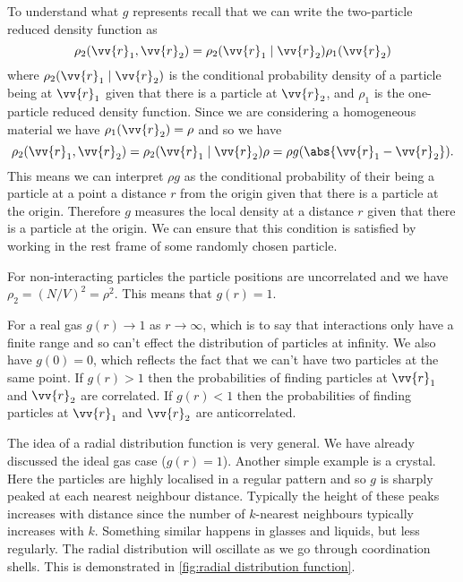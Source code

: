 \documentclass[fleqn]{NotesClass}
\begin{document}
    To understand what \(g\) represents recall that we can write the two-particle reduced density function as
    \begin{equation}
        \rho_2(\vv{r}_1, \vv{r}_2) = \rho_2(\vv{r}_1 \mid \vv{r}_2) \rho_1(\vv{r}_2)
    \end{equation}
    where \(\rho_2(\vv{r}_1 \mid \vv{r}_2)\) is the conditional probability density of a particle being at \(\vv{r}_1\) given that there is a particle at \(\vv{r}_2\), and \(\rho_1\) is the one-particle reduced density function.
    Since we are considering a homogeneous material we have \(\rho_1(\vv{r}_2) = \rho\) and so we have
    \begin{equation}
        \rho_2(\vv{r}_1, \vv{r}_2) = \rho_2(\vv{r}_1 \mid \vv{r}_2) \rho = \rho g(\abs{\vv{r}_1 - \vv{r}_2}).
    \end{equation}
    This means we can interpret \(\rho g\) as the conditional probability of their being a particle at a point a distance \(r\) from the origin given that there is a particle at the origin.
    Therefore \(g\) measures the local density at a distance \(r\) given that there is a particle at the origin.
    We can ensure that this condition is satisfied by working in the rest frame of some randomly chosen particle.
    
    For non-interacting particles the particle positions are uncorrelated and we have \(\rho_2 = (N/V)^2 = \rho^2\).
    This means that \(g(r) = 1\).
    
    For a real gas \(g(r) \to 1\) as \(r \to \infty\), which is to say that interactions only have a finite range and so can't effect the distribution of particles at infinity.
    We also have \(g(0) = 0\), which reflects the fact that we can't have two particles at the same point.
    If \(g(r) > 1\) then the probabilities of finding particles at \(\vv{r}_1\) and \(\vv{r}_2\) are correlated.
    If \(g(r) < 1\) then the probabilities of finding particles at \(\vv{r}_1\) and \(\vv{r}_2\) are anticorrelated.
    
    The idea of a radial distribution function is very general.
    We have already discussed the ideal gas case (\(g(r) = 1\)).
    Another simple example is a crystal.
    Here the particles are highly localised in a regular pattern and so \(g\) is sharply peaked at each nearest neighbour distance.
    Typically the height of these peaks increases with distance since the number of \(k\)-nearest neighbours typically increases with \(k\).
    Something similar happens in glasses and liquids, but less regularly.
    The radial distribution will oscillate as we go through coordination shells.
    This is demonstrated in \cref{fig:radial distribution function}.
    
\end{document}
